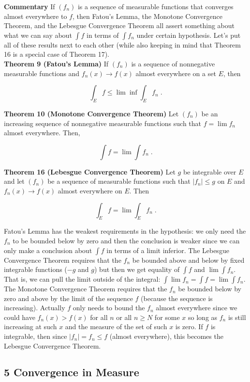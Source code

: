 \documentclass[a4paper]{article}
\begin{document}
{\bf Commentary} If $(f_n)$ is a sequence of measurable functions that converges almost everywhere to $f$, then Fatou's Lemma, the Monotone Convergence Theorem, and the Lebesgue Convergence Theorem all assert something about what we can say about $\int f$ in terms of $\int f_n$ under certain hypothesis. Let's put all of these results next to each other (while also keeping in mind that Theorem 16 is a special case of Theorem 17).\\

{\bf Theorem 9 (Fatou's Lemma)} If $(f_n)$ is a sequence of nonnegative measurable functions and $f_n(x) \rightarrow f(x)$ almost everywhere on a set $E$, then

$$\int_E f \leq \lim \inf \int_E f_n \;.$$

{\bf Theorem 10 (Monotone Convergence Theorem)} Let $(f_n)$ be an increasing sequence of nonnegative measurable functions such that $f = \lim f_n$ almost everywhere. Then,

$$\int f = \lim \int f_n \;.$$ 

{\bf Theorem 16 (Lebesgue Convergence Theorem)} Let $g$ be integrable over $E$ and let $(f_n)$ be a sequence of measurable functions such that $|f_n| \leq g$ on $E$ and $f_n(x) \rightarrow f(x)$ almost everywhere on $E$. Then

$$\int_E f  = \lim \int_E f_n \;. $$

Fatou's Lemma has the weakest requirements in the hypothesis: we only need the $f_n$ to be bounded below by zero and then the conclusion is weaker since we can only make a conclusion about $\int f$ in terms of a limit inferior. The Lebesgue Convergence Theorem requires that the $f_n$ be bounded above and below by fixed integrable functions ($-g$ and $g$) but then we get equality of $\int f$ and $\lim \int f_n$. That is, we can pull the limit outside of the integral: $\int \lim f_n = \int f = \lim \int f_n$. The Monotone Convergence Theorem requires that the $f_n$ be bounded below by zero and above by the limit of the sequence $f$ (because the sequence is increasing). Actually $f$ only needs to bound the $f_n$ almost everywhere since we could have $f_n(x) > f(x)$ for all $n$ or all $n\geq N$ for some $x$ so long as $f_n$ is still increasing at such $x$ and the measure of the set of such $x$ is zero. If $f$ is integrable, then since $|f_n| = f_n \leq f$ (almost everywhere), this becomes the Lebesgue Convergence Theorem. 

\subsection*{5 Convergence in Measure}
\end{document}
